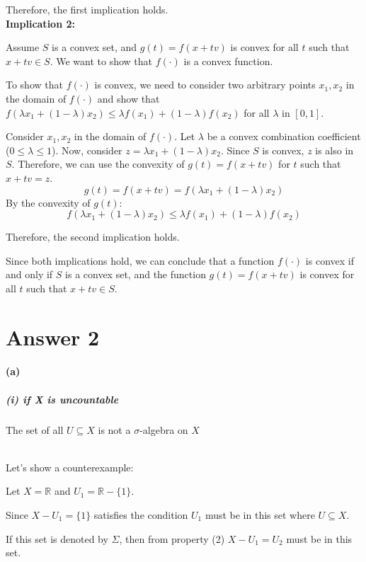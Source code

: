 \documentclass[12pt]{article}
\begin{document}
Therefore, the first implication holds. \\

\textbf{Implication 2:}

Assume \( S \) is a convex set, and \( g(t) = f(x + tv) \) is convex for all \( t \) such that \( x + tv \in S \). We want to show that \( f(·) \) is a convex function.

To show that \( f(·) \) is convex, we need to consider two arbitrary points \( x_1, x_2 \) in the domain of \( f(·) \) and show that \( f(\lambda x_1 + (1 - \lambda) x_2) \leq \lambda f(x_1) + (1 - \lambda) f(x_2) \) for all \( \lambda \) in \([0, 1]\).

Consider \( x_1, x_2 \) in the domain of \( f(·) \). Let \( \lambda \) be a convex combination coefficient (\( 0 \leq \lambda \leq 1 \)). Now, consider \( z = \lambda x_1 + (1 - \lambda) x_2 \). Since \( S \) is convex, \( z \) is also in \( S \). Therefore, we can use the convexity of \( g(t) = f(x + tv) \) for \( t \) such that \( x + tv = z \).
\[ g(t) = f(x + tv) = f(\lambda x_1 + (1 - \lambda) x_2) \]
By the convexity of \( g(t) \):
\[ f(\lambda x_1 + (1 - \lambda) x_2) \leq \lambda f(x_1) + (1 - \lambda) f(x_2) \]

Therefore, the second implication holds.

Since both implications hold, we can conclude that a function \( f(·) \) is convex if and only if \( S \) is a convex set, and the function \( g(t) = f(x + tv) \) is convex for all \( t \) such that \( x + tv \in S \).


\section*{Answer 2}
\paragraph{(a)}
\subparagraph{(i) if X is uncountable} 
The set of all \( U \subseteq X \) is not a \(\sigma\)-algebra on \(X\) \\ \\
\par \hspace*{1em}Let's show a counterexample: \\
\par \hspace*{1em}Let \( X = \mathbb{R} \) and \( U_1 = \mathbb{R} - \{1\} \). \\
\par \hspace*{1em}Since \( X - U_1 = \{1\} \) satisfies the condition \( U_1 \) must be in this set where \( U \subseteq X \).\\
\par \hspace*{1em}If this set is denoted by \( \Sigma \), then from property (2) \( X - U_1 = U_2 \) must be in this set.\\
\end{document}
